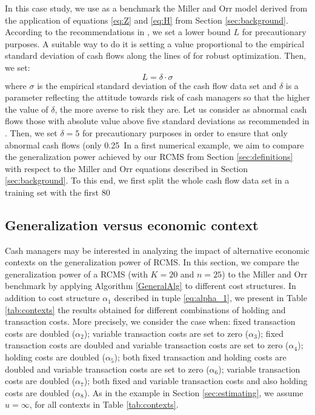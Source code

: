 In this case study, we use as a benchmark the Miller and Orr model derived from the application of equations \eqref{eq:Z} and \eqref{eq:H} from Section \ref{sec:background}. According to the recommendations in \cite{ross2002fundamentals}, we set a lower bound $L$ for precautionary purposes. A suitable way to do it is setting a value proportional to the empirical standard deviation of cash flows along the lines of \cite{ben1999robust,ben2009robust} for robust optimization. Then, we set:
\begin{equation}
L = \delta \cdot \sigma
\label{eq:lowerbound}
\end{equation}
where $\sigma$ is the empirical standard deviation of the cash flow data set and $\delta$ is a parameter reflecting the attitude towards risk of cash managers so that the higher the value of $\delta$, the more averse to risk they are. Let us consider as abnormal cash flows those with absolute value above five standard deviations as recommended in \cite{gormley2007utility}. Then, we set $\delta=5$ for precautionary purposes in order to ensure that only abnormal cash flows (only 0.25\
In a first numerical example, we aim to compare the generalization power achieved by our RCMS from Section \ref{sec:definitions} with respect to the Miller and Orr equations described in Section \ref{sec:background}. To this end, we first split the whole cash flow data set in a training set with the first 80\

\subsection{Generalization versus economic context}

Cash managers may be interested in analyzing the impact of alternative economic contexts on the generalization power of RCMS. In this section, we compare the generalization power of a RCMS (with $K=20$ and $n=25$) to the Miller and Orr benchmark by applying Algorithm \ref{GeneralAlg} to different cost structures. In addition to cost structure $\alpha_1$ described in tuple \eqref{eq:alpha_1}, we present in Table \ref{tab:contexts} the results obtained for different combinations of holding and transaction costs. More precisely, we consider the case when: fixed transaction costs are doubled ($\alpha_2$); variable transaction costs are set to zero ($\alpha_3$); fixed transaction costs are doubled and variable transaction costs are set to zero ($\alpha_4$); holding costs are doubled ($\alpha_5$); both fixed transaction and holding costs are doubled and variable transaction costs are set to zero ($\alpha_6$); variable  transaction costs are doubled ($\alpha_7$); both fixed and variable transaction costs and also holding costs are doubled ($\alpha_8$). As in the example in Section \ref{sec:estimating}, we assume $u =\infty$, for all contexts in Table \ref{tab:contexts}.

